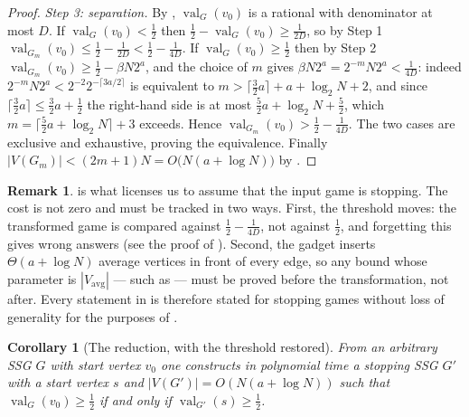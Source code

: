 \documentclass[11pt]{article}
\theoremstyle{plain}
\newtheorem{corollary}[theorem]{Corollary}
\theoremstyle{definition}
\newtheorem{remark}[theorem]{Remark}
\DeclareMathOperator{\val}{val}
\newcommand{\Vavg}{V_{\mathrm{avg}}}
\begin{document}
\begin{proof}
\emph{Step 3: separation.} By , $\val_G(v_0)$ is a
rational with denominator at most $D$. If $\val_G(v_0)<\tfrac12$ then
$\tfrac12-\val_G(v_0)\ge\tfrac{1}{2D}$, so by Step 1
$\val_{G_m}(v_0)\le\tfrac12-\tfrac1{2D}<\tfrac12-\tfrac1{4D}$. If
$\val_G(v_0)\ge\tfrac12$ then by Step 2
$\val_{G_m}(v_0)\ge\tfrac12-\beta N2^{a}$, and the choice of $m$ gives
$\beta N 2^{a}=2^{-m}N2^{a}<\tfrac{1}{4D}$: indeed
$2^{-m}N2^{a}<2^{-2}2^{-\lceil 3a/2\rceil}$ is equivalent to
$m>\lceil\tfrac32a\rceil+a+\log_2 N+2$, and since
$\lceil\tfrac32a\rceil\le\tfrac32a+\tfrac12$ the right-hand side is at most
$\tfrac52a+\log_2N+\tfrac52$, which $m=\lceil \tfrac52a+\log_2N\rceil+3$
exceeds. Hence
$\val_{G_m}(v_0)>\tfrac12-\tfrac1{4D}$. The two cases are exclusive and
exhaustive, proving the equivalence. Finally $|V(G_m)|<(2m+1)N=O\bigl(N(a+\log N)\bigr)$ by
.
\end{proof}

\begin{remark}
 is what licenses us to assume that the input
game is stopping. The cost is not zero and must be tracked in two ways.
First, the threshold moves: the transformed game is compared against
$\tfrac12-\tfrac1{4D}$, not against $\tfrac12$, and forgetting this gives
wrong answers (see the proof of ). Second,
the gadget inserts $\Theta(a+\log N)$ average vertices in front of every
edge, so any bound whose parameter is $|\Vavg|$ --- such as
 --- must be proved before the transformation, not
after. Every statement in
 is therefore stated for stopping
games without loss of generality for the purposes of .
\end{remark}

\begin{corollary}[The reduction, with the threshold restored]\label{cor:stopping-reduction}
From an arbitrary SSG $G$ with start vertex $v_0$ one constructs in
polynomial time a stopping SSG $G'$ with a start vertex $s$ and
$|V(G')|=O(N(a+\log N))$ such that $\val_G(v_0)\ge\tfrac12$ if and only
if $\val_{G'}(s)\ge\tfrac12$.
\end{corollary}
\end{document}
